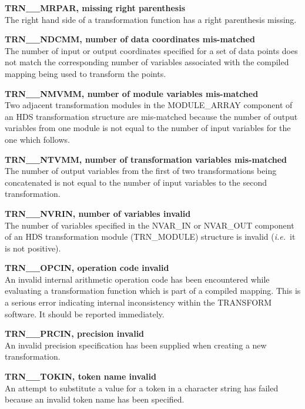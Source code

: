 \documentclass[twoside,11pt]{article}
\newcommand{\name}[1]{\mbox{\small{#1}}}
\begin{document}
\begin{description}
\item \textbf{TRN\_\_MRPAR, missing right parenthesis}\\
The right hand side of a transformation function has a right parenthesis
missing. 

\item \textbf{TRN\_\_NDCMM, number of data coordinates mis-matched}\\
The number of input or output coordinates specified for a set of data points
does not match the corresponding number of variables associated with the
compiled mapping being used to transform the points.

\item \textbf{TRN\_\_NMVMM, number of module variables mis-matched}\\
Two adjacent transformation modules in the \name{MODULE\_ARRAY} component of
an \name{HDS} transformation structure are mis-matched because the number of
output variables from one module is not equal to the number of input
variables for the one which follows. 

\item \textbf{TRN\_\_NTVMM, number of transformation variables mis-matched}\\
The number of output variables from the first of two transformations being
concatenated is not equal to the number of input variables to the second
transformation. 

\item \textbf{TRN\_\_NVRIN, number of variables invalid}\\
The number of variables specified in the \name{NVAR\_IN} or \name{NVAR\_OUT}
component of an \name{HDS} transformation module (\name{TRN\_MODULE})
structure is invalid (\emph{i.e.}\ it is not positive). 

\item \textbf{TRN\_\_OPCIN, operation code invalid}\\
An invalid internal arithmetic operation code has been encountered while
evaluating a transformation function which is part of a compiled mapping.
This is a serious error indicating internal inconsistency within the
\name{TRANSFORM} software. 
It should be reported immediately. 

\item \textbf{TRN\_\_PRCIN, precision invalid}\\
An invalid precision specification has been supplied when creating a new
transformation. 

\item \textbf{TRN\_\_TOKIN, token name invalid}\\
An attempt to substitute a value for a token in a character string has failed
because an invalid token name has been specified.


\end{description}
\end{document}
